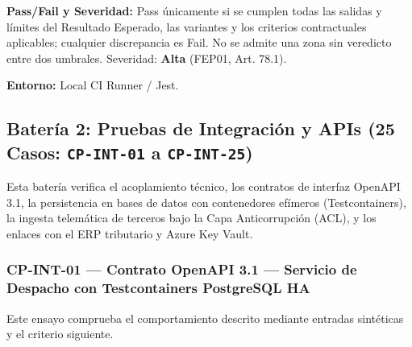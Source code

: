 \par\noindent\textbf{Pass/Fail y Severidad:} Pass únicamente si se cumplen todas las salidas y límites del Resultado Esperado, las variantes y los criterios contractuales aplicables; cualquier discrepancia es Fail. No se admite una zona sin veredicto entre dos umbrales. Severidad: \textbf{Alta} (FEP01, Art. 78.1).\par
\par\noindent\textbf{Entorno:} Local CI Runner / Jest.\par


\subsection*{Batería 2: Pruebas de Integración y APIs (25 Casos: \texttt{C\allowbreak{}P\allowbreak{}-\allowbreak{}I\allowbreak{}N\allowbreak{}T\allowbreak{}-\allowbreak{}0\allowbreak{}1\allowbreak{}} a \texttt{C\allowbreak{}P\allowbreak{}-\allowbreak{}I\allowbreak{}N\allowbreak{}T\allowbreak{}-\allowbreak{}2\allowbreak{}5\allowbreak{}})}

Esta batería verifica el acoplamiento técnico, los contratos de interfaz OpenAPI 3.1, la persistencia en bases de datos con contenedores efímeros (Testcontainers), la ingesta telemática de terceros bajo la Capa Anticorrupción (ACL), y los enlaces con el ERP tributario y Azure Key Vault.\par






\subsubsection*{CP-INT-01 — Contrato OpenAPI 3.1 — Servicio de Despacho con Testcontainers PostgreSQL HA}\label{sec:9-cp-int-01}
Este ensayo comprueba el comportamiento descrito mediante entradas sintéticas y el criterio siguiente.

